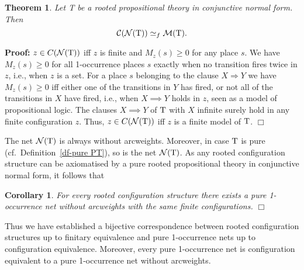 \documentclass[twocolumn]{article}
\newtheorem{theo}{Theorem}
\newtheorem{coro}{Corollary}
\newenvironment{theorem}[1]{\begin{theo} \rm \label{th-#1} }{\end{theo}}
\newenvironment{corollary}[1]{\begin{coro} \rm \label{cor-#1} }{\end{coro}}
\newenvironment{proof}{\begin{trivlist} \item[\hspace{\labelsep}\bf
Proof:]}{\hfill $\Box$\end{trivlist}}
\newcommand{\df}[1]{Definition~\ref{df-#1}}
\begin{document}
\begin{theorem}{PtoNtoC}
Let T be a rooted propositional theory in conjunctive normal
form. Then $${\cal C}({\cal N}({\rm T})) \simeq_f {\cal M}({\rm T}).$$
\end{theorem}

\begin{proof}
$z \in C({\cal N}({\rm T}))$ iff $z$ is finite and $M_z(s) \geq 0$ for any
place $s$. We have $M_z(s) \geq 0$ for all 1-occurrence places $s$
exactly when no transition fires twice in $z$, i.e., when $z$ is a set.
For a place $s$ belonging to the clause $X \Rightarrow Y$ we have
$M_z(s) \geq 0$ iff either one of the transitions in $Y$ has fired, or
not all of the transitions in $X$ have fired, i.e., when $X \implies Y$
holds in $z$, seen as a model of propositional logic. The clauses
$X \implies Y$ of ${\rm T}$ with $X$ infinite surely hold in any finite
configuration $z$.
Thus, $z \in C({\cal N}({\rm T}))$ iff $z$ is a finite model of ${\rm T}$.
\end{proof}
The net ${\cal N}({\rm T})$ is always without arcweights.
Moreover, in case ${\rm T}$ is pure (cf.\ \df{pure PT}), so is the net
${\cal N}({\rm T})$. As any rooted configuration structure can be axiomatised
by a pure rooted propositional theory in conjunctive normal form,
it follows that
\begin{corollary}{CtoN}
For every rooted configuration structure there exists a pure
1-occurrence net without arcweights with the same finite configurations.
\hfill $\Box$
\end{corollary}
Thus we have established a bijective correspondence between rooted
configuration structures up to finitary equivalence and pure
1-oc\-cur\-rence nets up to configuration equivalence.
Moreover, every pure 1-occurrence net is configuration
equivalent to a pure 1-occurrence net without arcweights.
\end{document}
